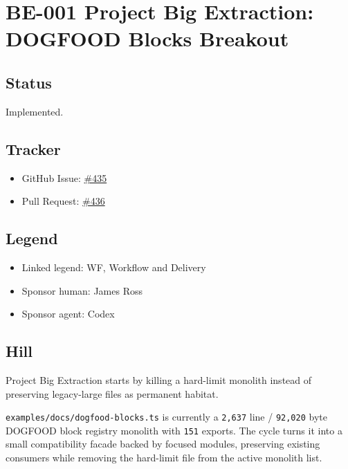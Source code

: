 \chapter{BE-001 Project Big Extraction: DOGFOOD Blocks Breakout}\label{record-253}

\smallskip

\section{Status}\label{record-253-status}

Implemented.

\section{Tracker}\label{record-253-tracker}

\begin{itemize}
\tightlist
\item
  GitHub Issue: \href{https://github.com/flyingrobots/bijou/issues/435}{\#435}
\item
  Pull Request: \href{https://github.com/flyingrobots/bijou/pull/436}{\#436}
\end{itemize}

\section{Legend}\label{record-253-legend}

\begin{itemize}
\tightlist
\item
  Linked legend: WF, Workflow and Delivery
\item
  Sponsor human: James Ross
\item
  Sponsor agent: Codex
\end{itemize}

\section{Hill}\label{record-253-hill}

Project Big Extraction starts by killing a hard-limit monolith instead of preserving legacy-large files as permanent habitat.

\texttt{e\allowbreak{}x\allowbreak{}a\allowbreak{}m\allowbreak{}p\allowbreak{}l\allowbreak{}e\allowbreak{}s\allowbreak{}/\allowbreak{}d\allowbreak{}o\allowbreak{}c\allowbreak{}s\allowbreak{}/\allowbreak{}d\allowbreak{}o\allowbreak{}g\allowbreak{}f\allowbreak{}o\allowbreak{}o\allowbreak{}d\allowbreak{}-\allowbreak{}b\allowbreak{}l\allowbreak{}o\allowbreak{}c\allowbreak{}k\allowbreak{}s\allowbreak{}.\allowbreak{}t\allowbreak{}s} is currently a \texttt{2\allowbreak{},\allowbreak{}6\allowbreak{}3\allowbreak{}7} line / \texttt{9\allowbreak{}2\allowbreak{},\allowbreak{}0\allowbreak{}2\allowbreak{}0} byte DOGFOOD block registry monolith with \texttt{1\allowbreak{}5\allowbreak{}1} exports. The cycle turns it into a small compatibility facade backed by focused modules, preserving existing consumers while removing the hard-limit file from the active monolith list.

